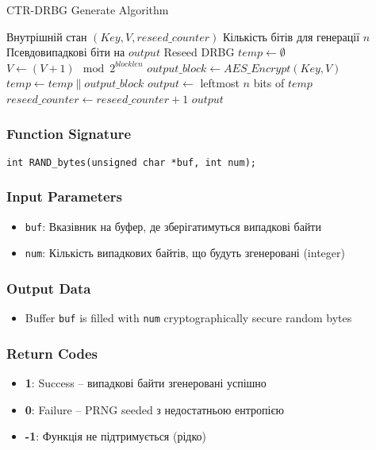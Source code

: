 \begin{algorithm}
    \caption{CTR-DRBG Generate Algorithm}
    \begin{algorithmic}[1]
        \Require Внутрішній стан $(Key, V, reseed\_counter)$
        \Require Кількість бітів для генерації $n$
        \Ensure Псевдовипадкові біти на $output$
        \State Reseed DRBG
        \EndIf
        \State $temp \gets \emptyset$
        \State $V \gets (V + 1) \mod 2^{blocklen}$
        \State $output\_block \gets AES\_Encrypt(Key, V)$
        \State $temp \gets temp \| output\_block$
        \EndWhile
        \State $output \gets$ leftmost $n$ bits of $temp$
        \State $reseed\_counter \gets reseed\_counter + 1$
        \State \Return $output$
    \end{algorithmic}
\end{algorithm}

\subsubsection{Function Signature}
\begin{verbatim}
int RAND_bytes(unsigned char *buf, int num);
\end{verbatim}

\subsubsection{Input Parameters}
\begin{itemize}
    \item \texttt{buf}: Вказівник на буфер, де зберігатимуться випадкові байти
    \item \texttt{num}:  Кількість випадкових байтів, що будуть згенеровані (integer)
\end{itemize}

\subsubsection{Output Data}
\begin{itemize}
    \item Buffer \texttt{buf} is filled with \texttt{num} cryptographically secure random bytes
\end{itemize}

\subsubsection{Return Codes}
\begin{itemize}
    \item \textbf{1}: Success -- випадкові байти згенеровані успішно
    \item \textbf{0}: Failure -- PRNG seeded з недостатньою ентропією
    \item \textbf{-1}: Функція не підтримується (рідко)
\end{itemize}

